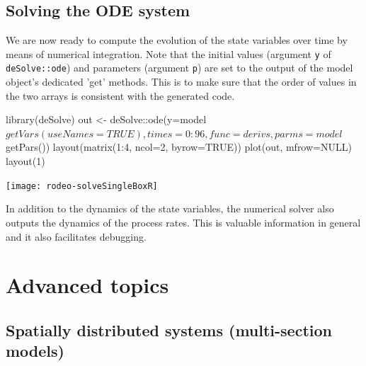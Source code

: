 \documentclass[onecolumn]{article}
\begin{document}
\begin{Schunk}
\end{Schunk}

\subsection{Solving the ODE system} \label{sec:solve-R}

We are now ready to compute the evolution of the state variables over time by means of numerical integration. Note that the initial values (argument \verb|y| of \verb|deSolve::ode|) and parameters (argument \verb|p|) are set to the output of the model object's dedicated 'get' methods. This is to make sure that the order of values in the two arrays is consistent with the generated code.

\begin{Schunk}
\begin{Sinput}
 library(deSolve)
 out <- deSolve::ode(y=model$getVars(useNames=TRUE), times=0:96, func=derivs,
   parms=model$getPars())
 layout(matrix(1:4, ncol=2, byrow=TRUE))
 plot(out, mfrow=NULL)
 layout(1)
\end{Sinput}
\end{Schunk}
\texttt{[image: rodeo-solveSingleBoxR]}

In addition to the dynamics of the state variables, the numerical solver also outputs the dynamics of the process rates. This is valuable information in general and it also facilitates debugging.


\clearpage
\section{Advanced topics} \label{sec:advanced}


\subsection{Spatially distributed systems (multi-section models)} \label{sec:advanced:multiSect}
\end{document}

